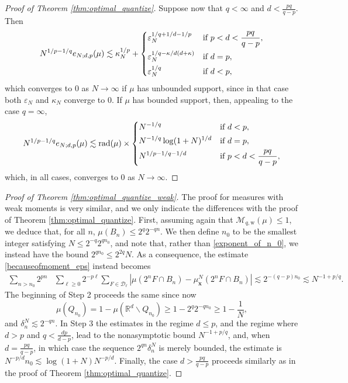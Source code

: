 \documentclass[11pt,reqno]{amsart}
\newcommand{\bx}{{\bm{x}}}
\newcommand{\rad}{\mathrm{rad}}
\theoremstyle{definition}
\def\bx{{\boldsymbol x}}
\newcommand{\weak}{{\mathrm{w}}}
\newcommand{\bm}[1]{\boldsymbol #1}
\newcommand{\RR}{{\mathbb R}}
\newcommand{\eps}{\varepsilon}
\newcommand{\mcl}{\mathcal}
\theoremstyle{definition}
\numberwithin{equation}{section}
\numberwithin{lemma}{section}
\numberwithin{proposition}{section}
\numberwithin{theorem}{section}
\numberwithin{corollary}{section}
\numberwithin{definition}{section}
\numberwithin{remark}{section}
\begin{document}
\begin{proof}[Proof of Theorem \ref{thm:optimal_quantize}]
Suppose now that $q < \infty$ and $d < \frac{pq}{q-p}$. Then
\[
    N^{1/p-1/q}e_{N;d,p}(\mu)
    \lesssim
    \kappa_N^{1/p} + 
    \begin{dcases}
        \eps_N^{1/q + 1/d - 1/p} & \text{if } p < d < \frac{pq}{q-p}, \\
        \eps_N^{1/q - \kappa/d(d+\kappa)} & \text{if } d = p, \\
        \eps_N^{1/q} & \text{if } d < p,
    \end{dcases}
\]
which converges to $0$ as $N \to \infty$ if $\mu$ has unbounded support, since in that case both $\eps_N$ and $\kappa_N$ converge to $0$. If $\mu$ has bounded support, then, appealing to the case $q = \infty$,
\[
    N^{1/p-1/q} e_{N;d,p}(\mu) \lesssim \rad(\mu) \times
    \begin{dcases}
        N^{-1/q} & \text{if } d < p, \\
        N^{-1/q} \log(1+N)^{1/d} & \text{if } d = p, \\
        N^{1/p - 1/q - 1/d} & \text{if } p < d < \frac{pq}{q-p},
    \end{dcases}
\]
which, in all cases, converges to $0$ as $N \to \infty$.
\end{proof}

\begin{proof}[Proof of Theorem \ref{thm:optimal_quantize_weak}]
	The proof for measures with weak moments is very similar, and we only indicate the differences with the proof of Theorem \ref{thm:optimal_quantize}. First, assuming again that $\mcl M_{q,\weak}(\mu) \le 1$, we deduce that, for all $n$, $\mu(B_n) \le 2^q 2^{-qn}$. We then define $n_0$ to be the smallest integer satisfying $N \le 2^{-q} 2^{qn_0}$, and note that, rather than \eqref{exponent_of_n_0}, we instead have the bound $2^{qn_0} \le 2^{2q} N$. As a consequence, the estimate \eqref{becauseofmoment_eps} instead becomes
	\begin{align*}
		\sum_{n > n_0} 2^{pn}& \sum_{\ell \ge 0} 2^{-p\ell} \sum_{F \in \mcl D_\ell} |\mu(2^n F \cap B_n) - \mu^N_\bx(2^n F \cap B_n)| 
		\lesssim 2^{-(q-p)n_0} \lesssim N^{-1 +p/q}. 
	\end{align*}
	The beginning of Step 2 proceeds the same since now
	\[
		\mu(Q_{n_0}) = 1 - \mu(\RR^d \backslash Q_{n_0})\ge 1 - 2^q 2^{-qn_0} \ge 1 -  \frac{1}{N},
	\]
	and $\delta_n^N \lesssim 2^{-qn}$. In Step 3 the estimates in the regime $d \le p$, and the regime where $d > p$ and $q < \frac{dp}{d-p}$, lead to the nonasymptotic bound $N^{-1 + p/q}$, and, when $d = \frac{pq}{q-p}$, in which case the sequence $2^{qn} \delta_n^N$ is merely bounded, the estimate is $N^{-p/d} n_0 \lesssim \log(1+N) N^{-p/d}$.
	Finally, the case $d > \frac{pq}{q-p}$ proceeds similarly as in the proof of Theorem \ref{thm:optimal_quantize}.
\end{proof}
\end{document}
